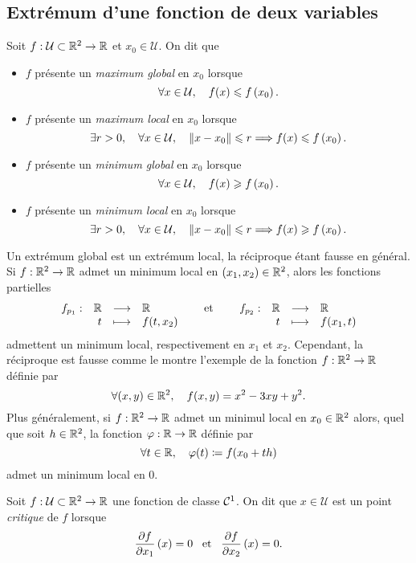 \documentclass{magnolia}
\begin{document}
\subsection{Extrémum d'une fonction de deux variables}

\begin{definition}
Soit $f:\mathcal{U}\subset\mathbb{R}^2\to\mathbb{R}$ et $x_0\in\mathcal{U}$. On dit que
\begin{itemize}
\item $f$ présente un \emph{maximum global} en $x_0$ lorsque
  \[\forall x\in\mathcal{U} ,\quad f(x)\leqslant f\left(x_0\right).\]
\item $f$ présente un \emph{maximum local} en $x_0$ lorsque
  \[\exists r>0,\quad \forall x\in\mathcal{U} ,\quad \left\|x-x_0\right\|\leqslant r \Longrightarrow
    f(x)\leqslant f\left(x_0\right).\]
\item $f$ présente un \emph{minimum global} en $x_0$ lorsque
  \[\forall x\in\mathcal{U} ,\quad f(x)\geqslant f\left(x_0\right).\]
\item $f$ présente un \emph{minimum local} en $x_0$ lorsque
  \[\exists r>0,\quad \forall x\in\mathcal{U} ,\quad \left\|x-x_0\right\|\leqslant r \Longrightarrow
    f(x)\geqslant f\left(x_0\right).\]
\end{itemize}
\end{definition}

\begin{remarques}
\remarque Un extrémum global est un extrémum local, la réciproque étant fausse en général.
\remarque Si $f:\mathbb{R}^2\to\mathbb{R}$ admet un minimum local en
  $(x_1,x_2)\in\mathbb{R}^2$, alors les fonctions partielles
  \[\begin{array}[t]{lrcl} \displaystyle{f_{p_1}} : & \displaystyle{\mathbb{R}} & \longrightarrow & \displaystyle{\mathbb{R}} \\ & \displaystyle{t} & \longmapsto & \displaystyle{f(t,x_2)} \end{array} \quad\quad\!\text{et}\quad\!\quad
    \begin{array}[t]{lrcl} \displaystyle{f_{p_2}} : & \displaystyle{\mathbb{R}} & \longrightarrow & \displaystyle{\mathbb{R}} \\ & \displaystyle{t} & \longmapsto & \displaystyle{f(x_1,t)} \end{array}\]
  admettent un minimum local, respectivement en $x_1$ et $x_2$.
  Cependant, la réciproque est fausse comme le montre l'exemple de la fonction
  $f:\mathbb{R}^2\to\mathbb{R}$ définie par
  \[\forall (x,y)\in\mathbb{R}^2,\quad f(x,y)=x^2-3xy+y^2.\]
\remarque Plus généralement, si $f:\mathbb{R}^2\to\mathbb{R}$ admet un minimul local en $x_0\in\mathbb{R}^2$ alors,
  quel que soit $h\in\mathbb{R}^2$, la fonction $\varphi:\mathbb{R}\to\mathbb{R}$ définie par
  \[\forall t\in\mathbb{R},\quad \varphi(t)\coloneqq f(x_0+th)\]
  admet un minimum local en $0$. 
\end{remarques}

\begin{definition}
Soit $f:\mathcal{U}\subset\mathbb{R}^2\to\mathbb{R}$ une fonction de classe $\mathcal{C}^{1}$. On dit que $x\in\mathcal{U}$
est un point \emph{critique} de $f$ lorsque
\[\frac{\partial f}{\partial x_1}\left(x\right)=0 \quad\!\text{et}\quad\! \frac{\partial f}{\partial x_2}\left(x\right)=0.\]
\end{definition}
\end{document}
